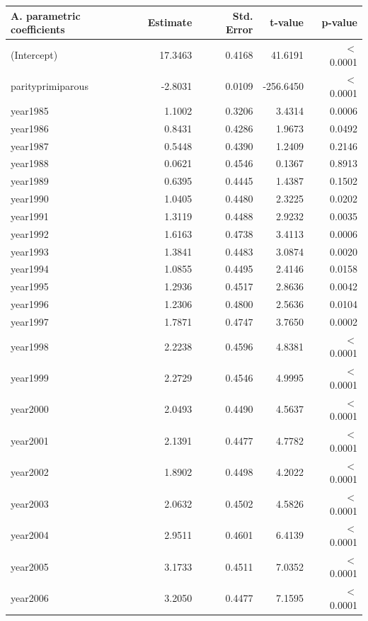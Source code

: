     \begin{table}[H]
    \centering
    \begin{tabular}{lrrrr}
    \textbf{A. parametric coefficients} & Estimate & Std. Error & t-value & p-value \\ 
       \hline
       \hline
      (Intercept) & 17.3463 & 0.4168 & 41.6191 & $<$ 0.0001 \\ 
      parityprimiparous & -2.8031 & 0.0109 & -256.6450 & $<$ 0.0001 \\ 
      year1985 & 1.1002 & 0.3206 & 3.4314 & 0.0006 \\ 
      year1986 & 0.8431 & 0.4286 & 1.9673 & 0.0492 \\ 
      year1987 & 0.5448 & 0.4390 & 1.2409 & 0.2146 \\ 
      year1988 & 0.0621 & 0.4546 & 0.1367 & 0.8913 \\ 
      year1989 & 0.6395 & 0.4445 & 1.4387 & 0.1502 \\ 
      year1990 & 1.0405 & 0.4480 & 2.3225 & 0.0202 \\ 
      year1991 & 1.3119 & 0.4488 & 2.9232 & 0.0035 \\ 
      year1992 & 1.6163 & 0.4738 & 3.4113 & 0.0006 \\ 
      year1993 & 1.3841 & 0.4483 & 3.0874 & 0.0020 \\ 
      year1994 & 1.0855 & 0.4495 & 2.4146 & 0.0158 \\ 
      year1995 & 1.2936 & 0.4517 & 2.8636 & 0.0042 \\ 
      year1996 & 1.2306 & 0.4800 & 2.5636 & 0.0104 \\ 
      year1997 & 1.7871 & 0.4747 & 3.7650 & 0.0002 \\ 
      year1998 & 2.2238 & 0.4596 & 4.8381 & $<$ 0.0001 \\ 
      year1999 & 2.2729 & 0.4546 & 4.9995 & $<$ 0.0001 \\ 
      year2000 & 2.0493 & 0.4490 & 4.5637 & $<$ 0.0001 \\ 
      year2001 & 2.1391 & 0.4477 & 4.7782 & $<$ 0.0001 \\ 
      year2002 & 1.8902 & 0.4498 & 4.2022 & $<$ 0.0001 \\ 
      year2003 & 2.0632 & 0.4502 & 4.5826 & $<$ 0.0001 \\ 
      year2004 & 2.9511 & 0.4601 & 6.4139 & $<$ 0.0001 \\ 
      year2005 & 3.1733 & 0.4511 & 7.0352 & $<$ 0.0001 \\ 
      year2006 & 3.2050 & 0.4477 & 7.1595 & $<$ 0.0001 \\ 

\end{tabular}
\end{table}
